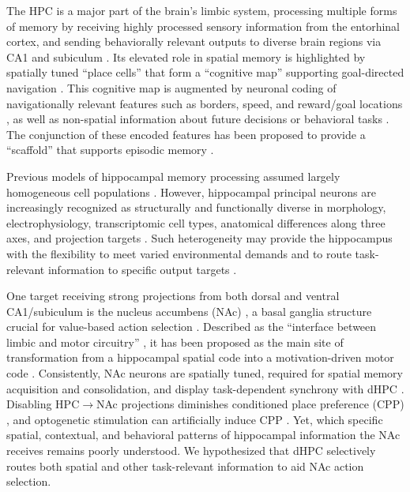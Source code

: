 \documentclass[10pt,a4paper]{article}
\begin{document}
The HPC is a major part of the brain's limbic system, processing multiple forms of memory by receiving highly processed sensory information from the entorhinal cortex, and sending behaviorally relevant outputs to diverse brain regions via CA1 and subiculum \cite{knierim2014hippocampus}. Its elevated role in spatial memory is highlighted by spatially tuned ``place cells'' that form a ``cognitive map'' supporting goal-directed navigation \cite{okeefe1978hippocampus,moser2008place}. This cognitive map is augmented by neuronal coding of navigationally relevant features such as borders, speed, and reward/goal locations \cite{kropff2015speed,solstad2008representation,hollup2001accumulation,dupret2010reorganization}, as well as non-spatial information about future decisions or behavioral tasks \cite{wood2000hippocampal,mckenzie2014hippocampal}. The conjunction of these encoded features has been proposed to provide a ``scaffold'' that supports episodic memory \cite{eichenbaum2014can}.

Previous models of hippocampal memory processing assumed largely homogeneous cell populations \cite{marr1971simple,treves1994computational}. However, hippocampal principal neurons are increasingly recognized as structurally and functionally diverse in morphology, electrophysiology, transcriptomic cell types, anatomical differences along three axes, and projection targets \cite{soltesz2018neuronal,cembrowski2019heterogeneity}. Such heterogeneity may provide the hippocampus with the flexibility to meet varied environmental demands and to route task-relevant information to specific output targets \cite{ciocchi2015selective,okuyama2016ventral}.

One target receiving strong projections from both dorsal and ventral CA1/subiculum is the nucleus accumbens (NAc) \cite{groenewegen1987organization,swanson1977hippocampo}, a basal ganglia structure crucial for value-based action selection \cite{mogenson1980motivation,floresco2015nucleus}. Described as the ``interface between limbic and motor circuitry'' \cite{mogenson1980motivation}, it has been proposed as the main site of transformation from a hippocampal spatial code into a motivation-driven motor code \cite{pennartz2011hippocampal}. Consistently, NAc neurons are spatially tuned, required for spatial memory acquisition and consolidation, and display task-dependent synchrony with dHPC \cite{lansink2008preferential,lansink2009hippocampus,vankessel2008nucleus,tabuchi2000hippocampal}. Disabling HPC$\rightarrow$NAc projections diminishes conditioned place preference (CPP) \cite{ito2008functional,loureiro2016hippocampal}, and optogenetic stimulation can artificially induce CPP \cite{trouche2019new,legates2018reward}. Yet, which specific spatial, contextual, and behavioral patterns of hippocampal information the NAc receives remains poorly understood. We hypothesized that dHPC selectively routes both spatial and other task-relevant information to aid NAc action selection.
\end{document}
